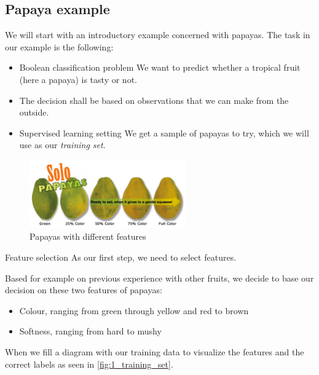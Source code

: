 \subsection*{Papaya example}
We will start with an introductory example concerned with papayas. The task in our example is the following: 

\begin{itemize}
  \item \begin{tikzborder}{Boolean classification problem} We want to predict whether a tropical fruit (here a papaya) is tasty or not.\end{tikzborder}
  \item The decision shall be based on observations that we can make from the outside.
  \item \begin{tikzborder}{Supervised learning setting} We get a sample of papayas to try, which we will use as our \textit{training set}.
  \end{tikzborder}
\end{itemize}

\begin{figure}[h]
  \centering
  \includegraphics[width=0.6\textwidth]{assets/slf/papayas.jpg} 
  \caption{Papayas with different features}
  \label{fig:1_papaya}
\end{figure}

\begin{tikzborder}{Feature selection} As our first step, we need to select features.\end{tikzborder} Based for example on previous experience with other fruits, we decide to base our decision on these two features of papayas:
\begin{itemize}
  \item Colour, ranging from green through yellow and red to brown
  \item Softness, ranging from hard to mushy
\end{itemize}

When we fill a diagram with our training data to visualize the features and the correct labels as seen in \ref{fig:1_training_set}.


